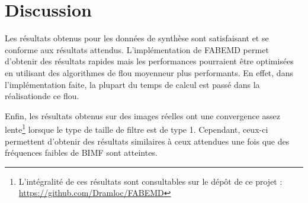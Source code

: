\chapter{Discussion}
Les résultats obtenus pour les données de synthèse sont satisfaisant et se conforme aux résultats attendus. L'implémentation de FABEMD permet d'obtenir des résultats rapides mais les performances pourraient être optimisées en utilisant des algorithmes de flou moyenneur plus performants. En effet, dans l'implémentation faite, la plupart du temps de calcul est passé dans la réalisationde ce flou.

Enfin, les résultats obtenus sur des images réelles ont une convergence assez lente\footnote{L'intégralité de ces résultats sont consultables sur le dépôt de ce projet : \url{https://github.com/Dramloc/FABEMD}} lorsque le type de taille de filtre est de type 1. Cependant, ceux-ci permettent d'obtenir des résultats similaires à ceux attendues une fois que des fréquences faibles de BIMF sont atteintes. 